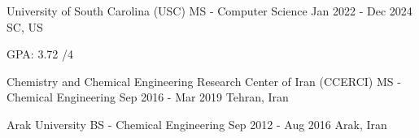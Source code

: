 {}


\begin{cventries}


\cventry
  {University of South Carolina (USC)}   %
  {MS - Computer Science}       %
  {Jan 2022 - Dec 2024}                      %
  {SC, US}                                   %
  {
    \begin{cvitems}                           %
      \item {GPA: 3.72 /4}
    \end{cvitems}
  }

\vspace{0.05cm}
\cventry
  {Chemistry and Chemical Engineering Research Center of Iran (CCERCI)}
  {MS - Chemical Engineering}
  {Sep 2016 - Mar 2019}
  {Tehran, Iran}
  {
  }

\vspace{-0.35cm}
\cventry
  {Arak University}
  {BS - Chemical Engineering}
  {Sep 2012 - Aug 2016}
  {Arak, Iran}
  {
  }

\end{cventries}
